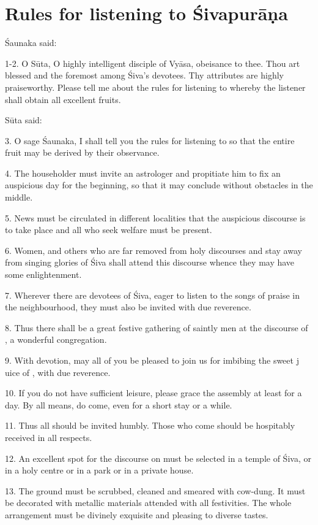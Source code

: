 \chapter{Rules for listening to Śivapurāṇa}

Śaunaka said:

1-2. O Sūta, O highly intelligent disciple of Vyāsa, obeisance to thee. Thou art
blessed and the foremost among Śiva’s devotees. Thy attributes are highly
praiseworthy. Please tell me about the rules for listening to 
whereby the listener shall obtain all excellent fruits.

Sūta said:

3. O sage Śaunaka, I shall tell you the rules for listening to 
so that the entire fruit may be derived by their observance.

4. The householder must invite an astrologer and propitiate him to fix an
auspicious day for the beginning, so that it may conclude without obstacles in
the middle.

5. News must be circulated in different localities that the auspicious discourse
is to take place and all who seek welfare must be present.

6. Women,  and others who are far removed from holy discourses and
stay away from singing glories of Śiva shall attend this discourse whence they
may have some enlightenment.

7. Wherever there are devotees of Śiva, eager to listen to the songs of praise
in the neighbourhood, they must also be invited with due reverence.

8. Thus there shall be a great festive gathering of saintly men at the discourse
of , a wonderful congregation.

9. With devotion, may all of you be pleased to join us for imbibing the sweet j
uice of , with due reverence.

10. If you do not have sufficient leisure, please grace the assembly at least
for a day. By all means, do come, even for a short stay or a while.

11. Thus all should be invited humbly. Those who come should be hospitably
received in all respects.

12. An excellent spot for the discourse on  must be selected in
a temple of Śiva, or in a holy centre or in a park or in a private house.

13. The ground must be scrubbed, cleaned and smeared with cow-dung. It must be
decorated with metallic materials attended with all festivities. The whole
arrangement must be divinely exquisite and pleasing to diverse tastes.

